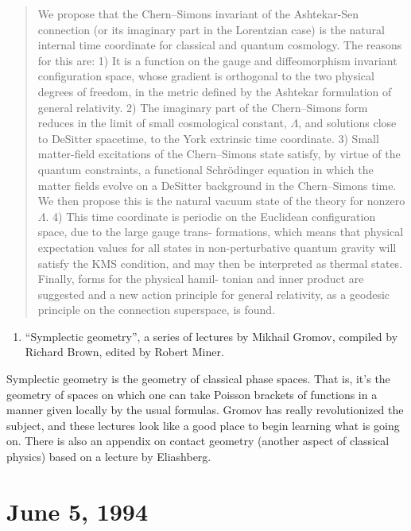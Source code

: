 \documentclass[12pt]{article}
\def\tightlist{}
\begin{document}
\begin{quote}
We propose that the Chern--Simons invariant of the Ashtekar-Sen
connection (or its imaginary part in the Lorentzian case) is the natural
internal time coordinate for classical and quantum cosmology. The
reasons for this are: 1) It is a function on the gauge and
diffeomorphism invariant configuration space, whose gradient is
orthogonal to the two physical degrees of freedom, in the metric defined
by the Ashtekar formulation of general relativity. 2) The imaginary part
of the Chern--Simons form reduces in the limit of small cosmological
constant, \(\Lambda\), and solutions close to DeSitter spacetime, to the
York extrinsic time coordinate. 3) Small matter-field excitations of the
Chern--Simons state satisfy, by virtue of the quantum constraints, a
functional Schr\"odinger equation in which the matter fields evolve on a
DeSitter background in the Chern--Simons time. We then propose this is
the natural vacuum state of the theory for nonzero \(\Lambda\). 4) This
time coordinate is periodic on the Euclidean configuration space, due to
the large gauge trans- formations, which means that physical expectation
values for all states in non-perturbative quantum gravity will satisfy
the KMS condition, and may then be interpreted as thermal states.
Finally, forms for the physical hamil- tonian and inner product are
suggested and a new action principle for general relativity, as a
geodesic principle on the connection superspace, is found.
\end{quote}

\begin{enumerate}
\def\labelenumi{\arabic{enumi})}
\setcounter{enumi}{4}
\tightlist
\item
  ``Symplectic geometry'', a series of lectures by Mikhail Gromov,
  compiled by Richard Brown, edited by Robert Miner.
 
\end{enumerate}
\noindent
Symplectic geometry is the geometry of classical phase spaces. That is,
it's the geometry of spaces on which one can take Poisson brackets of
functions in a manner given locally by the usual formulas. Gromov has
really revolutionized the subject, and these lectures look like a good
place to begin learning what is going on. There is also an appendix on
contact geometry (another aspect of classical physics) based on a
lecture by Eliashberg.



\hypertarget{week35}{%
\section{June 5, 1994}\label{week35}}
\end{document}
